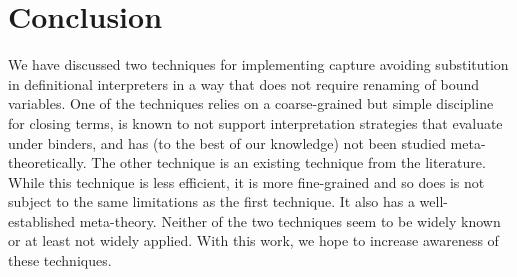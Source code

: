 \section{Conclusion}
\label{sec:conclusion}

We have discussed two techniques for implementing capture avoiding substitution in definitional interpreters in a way that does not require renaming of bound variables.
One of the techniques relies on a coarse-grained but simple discipline for closing terms, is known to not support interpretation strategies that evaluate under binders, and has (to the best of our knowledge) not been studied meta-theoretically.
The other technique is an existing technique from the literature.
While this technique is less efficient, it is more fine-grained and so does is not subject to the same limitations as the first technique.
It also has a well-established meta-theory. 
Neither of the two techniques seem to be widely known or at least not widely applied.
With this work, we hope to increase awareness of these techniques.

